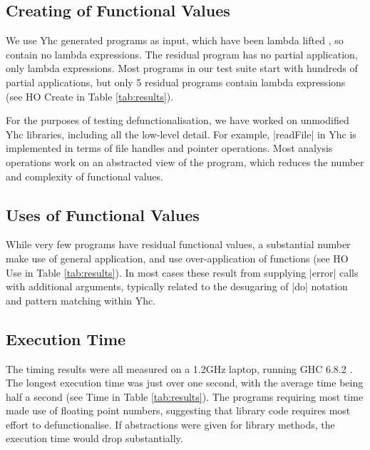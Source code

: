 \documentclass[preprint]{sigplanconf}
\begin{document}
\subsection{Creating of Functional Values}


We use Yhc generated programs as input, which have been lambda lifted \cite{lambda_lift}, so contain no lambda expressions. The residual program has no partial application, only lambda expressions. Most programs in our test suite start with hundreds of partial applications, but only 5 residual programs contain lambda expressions (see HO Create in Table \ref{tab:results}).

For the purposes of testing defunctionalisation, we have worked on unmodified Yhc libraries, including all the low-level detail. For example, |readFile| in Yhc is implemented in terms of file handles and pointer operations. Most analysis operations work on an abstracted view of the program, which reduces the number and complexity of functional values.

\subsection{Uses of Functional Values}

While very few programs have residual functional values, a substantial number make use of general application, and use over-application of functions (see HO Use in Table \ref{tab:results}). In most cases these result from supplying |error| calls with additional arguments, typically related to the desugaring of |do| notation and pattern matching within Yhc.

\subsection{Execution Time}
\label{sec:time}

The timing results were all measured on a 1.2GHz laptop, running GHC 6.8.2 \cite{ghc}. The longest execution time was just over one second, with the average time being half a second (see Time in Table \ref{tab:results}). The programs requiring most time made use of floating point numbers, suggesting that library code requires most effort to defunctionalise. If abstractions were given for library methods, the execution time would drop substantially.
\end{document}
